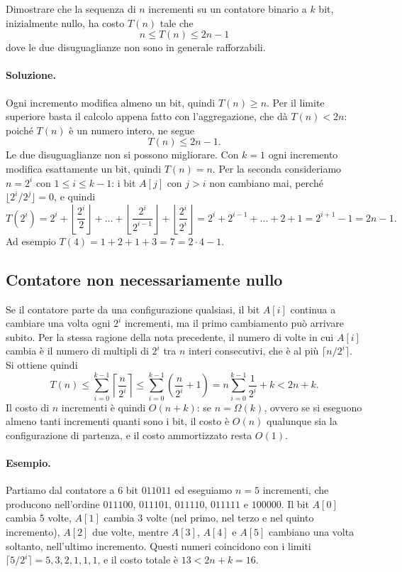 \begin{esercizio}
Dimostrare che la sequenza di $n$ incrementi su un contatore binario a $k$ bit, inizialmente nullo, ha costo $T(n)$ tale che
\[
n \le T(n) \le 2n-1
\]
dove le due disuguaglianze non sono in generale rafforzabili.
\end{esercizio}

\paragraph{Soluzione.}
Ogni incremento modifica almeno un bit, quindi $T(n) \ge n$. Per il limite superiore basta il calcolo appena fatto con l'aggregazione, che dà $T(n) < 2n$: poiché $T(n)$ è un numero intero, ne segue
\[
T(n) \le 2n - 1.
\]
Le due disuguaglianze non si possono migliorare. Con $k=1$ ogni incremento modifica esattamente un bit, quindi $T(n)=n$. Per la seconda consideriamo $n = 2^i$ con $1 \le i \le k-1$: i bit $A[j]$ con $j > i$ non cambiano mai, perché $\lfloor 2^i/2^j \rfloor = 0$, e quindi
\[
T(2^i) = 2^i + \left\lfloor \frac{2^i}{2} \right\rfloor + \dots + \left\lfloor \frac{2^i}{2^{i-1}} \right\rfloor + \left\lfloor \frac{2^i}{2^i} \right\rfloor = 2^i + 2^{i-1} + \dots + 2 + 1 = 2^{i+1} - 1 = 2n - 1.
\]
Ad esempio $T(4) = 1+2+1+3 = 7 = 2\cdot 4 -1$.

\subsection{Contatore non necessariamente nullo}
Se il contatore parte da una configurazione qualsiasi, il bit $A[i]$ continua a cambiare una volta ogni $2^i$ incrementi, ma il primo cambiamento può arrivare subito. Per la stessa ragione della nota precedente, il numero di volte in cui $A[i]$ cambia è il numero di multipli di $2^i$ tra $n$ interi consecutivi, che è al più $\lceil n/2^i \rceil$. Si ottiene quindi
\[
T(n) \le \sum_{i=0}^{k-1} \left\lceil \frac{n}{2^i} \right\rceil \le \sum_{i=0}^{k-1} \left(\frac{n}{2^i} + 1\right) = n \sum_{i=0}^{k-1} \frac{1}{2^i} + k < 2n + k.
\]
Il costo di $n$ incrementi è quindi $O(n+k)$: se $n = \Omega(k)$, ovvero se si eseguono almeno tanti incrementi quanti sono i bit, il costo è $O(n)$ qualunque sia la configurazione di partenza, e il costo ammortizzato resta $O(1)$.

\paragraph{Esempio.}
Partiamo dal contatore a $6$ bit $011011$ ed eseguiamo $n=5$ incrementi, che producono nell'ordine $011100$, $011101$, $011110$, $011111$ e $100000$. Il bit $A[0]$ cambia $5$ volte, $A[1]$ cambia $3$ volte (nel primo, nel terzo e nel quinto incremento), $A[2]$ due volte, mentre $A[3]$, $A[4]$ e $A[5]$ cambiano una volta soltanto, nell'ultimo incremento. Questi numeri coincidono con i limiti $\lceil 5/2^i \rceil = 5,3,2,1,1,1$, e il costo totale è $13 < 2n + k = 16$.

